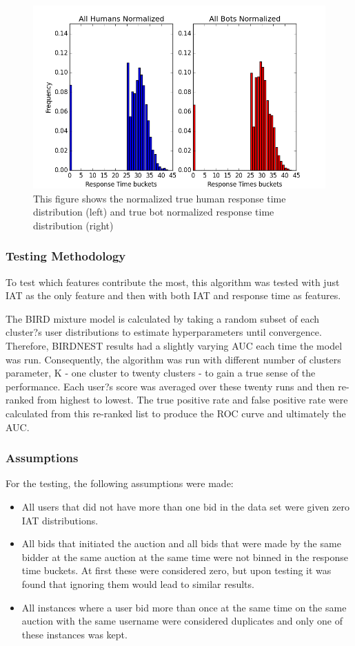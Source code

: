 \documentclass{article} %
\begin{document}
\begin{figure}[h]
\centering
{\caption{This figure shows the normalized true human response time distribution (left) and true bot normalized response time distribution (right)} \includegraphics[scale=0.5]{img/bird_res_dist.png}}
\end{figure}

\subsubsection{Testing Methodology}

To test which features contribute the most, this algorithm was tested with just IAT as the only feature and then with both IAT and response time as features.

The BIRD mixture model is calculated by taking a random subset of each cluster?s user distributions to estimate hyperparameters until convergence. Therefore, BIRDNEST results had a slightly varying AUC each time the model was run. Consequently, the algorithm was run with different number of clusters parameter, K - one cluster to twenty clusters -  to gain a true sense of the performance. Each user?s score was averaged over these twenty runs and then re-ranked from highest to lowest. The true positive rate and false positive rate were calculated from this re-ranked list to produce the ROC curve and ultimately the AUC.

\subsubsection{Assumptions}

For the testing, the following assumptions were made:
\begin{itemize}
	\item All users that did not have more than one bid in the data set were given zero IAT distributions.
\item All bids that initiated the auction and all bids that were made by the same bidder at the same auction at the same time were not binned in the response time buckets. At first these were considered zero, but upon testing it was found that ignoring them would lead to similar results.
\item All instances where a user bid more than once at the same time on the same auction with the same username were considered duplicates and only one of these instances was kept.
\end{itemize}
\end{document}
